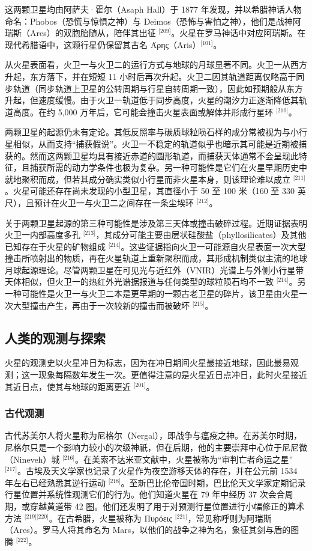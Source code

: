 这两颗卫星均由阿萨夫·霍尔（Asaph Hall）于 1877 年发现，并以希腊神话人物命名：Phobos（恐慌与惊惧之神）与 Deimos（恐怖与害怕之神），他们是战神阿瑞斯（Ares）的双胞胎随从，陪伴其出征 \(^{\text{[209]}}\)。火星在罗马神话中对应阿瑞斯。在现代希腊语中，这颗行星仍保留其古名 Άρης（Aris）\(^{\text{[101]}}\)。

从火星表面看，火卫一与火卫二的运行方式与地球的月球显著不同。火卫一从西方升起，东方落下，并在短短 11 小时后再次升起。火卫二因其轨道距离仅略高于同步轨道（同步轨道上卫星的公转周期与行星自转周期一致），因此如预期般从东方升起，但速度缓慢。由于火卫一轨道低于同步高度，火星的潮汐力正逐渐降低其轨道高度。在约 5,000 万年后，它可能会撞击火星表面或解体并形成行星环 \(^{\text{[210]}}\)。

两颗卫星的起源仍未有定论。其低反照率与碳质球粒陨石样的成分常被视为与小行星相似，从而支持“捕获假说”。火卫一不稳定的轨道似乎也暗示其可能是近期被捕获的。然而这两颗卫星均具有接近赤道的圆形轨道，而捕获天体通常不会呈现此特征，且捕获所需的动力学条件也极为复杂。另一种可能性是它们在火星早期历史中就地聚积而成，但若其成分确实类似小行星而非火星本身，则该理论难以成立 \(^{\text{[211]}}\)。火星可能还存在尚未发现的小型卫星，其直径小于 50 至 100 米（160 至 330 英尺），且预计在火卫一与火卫二之间存在一条尘埃环 \(^{\text{[212]}}\)。

关于两颗卫星起源的第三种可能性是涉及第三天体或撞击破碎过程。近期证据表明火卫一内部高度多孔 \(^{\text{[213]}}\)，其成分可能主要由层状硅酸盐（phyllosilicates）及其他已知存在于火星的矿物组成 \(^{\text{[214]}}\)。这些证据指向火卫一可能源自火星表面一次大型撞击所喷射出的物质，再在火星轨道上重新聚积而成，其形成机制类似主流的地球月球起源理论。尽管两颗卫星在可见光与近红外（VNIR）光谱上与外侧小行星带天体相似，但火卫一的热红外光谱据报道与任何类型的球粒陨石均不一致 \(^{\text{[214]}}\)。另一种可能性是火卫一与火卫二本是更早期的一颗古老卫星的碎片，该卫星由火星一次大型撞击产生，再由于一次较新的撞击而被破坏 \(^{\text{[215]}}\)。
\subsection{人类的观测与探索}
火星的观测史以火星冲日为标志，因为在冲日期间火星最接近地球，因此最易观测；这一现象每隔数年发生一次。更值得注意的是火星近日点冲日，此时火星接近其近日点，使其与地球的距离更近 \(^{\text{[201]}}\)。
\subsubsection{古代观测}  
古代苏美尔人将火星称为尼格尔（Nergal），即战争与瘟疫之神。在苏美尔时期，尼格尔只是一个影响力较小的次级神祇，但在后期，他的主要崇拜中心位于尼尼微（Nineveh）城 \(^{\text{[216]}}\)。在美索不达米亚文献中，火星被称为“审判亡者命运之星” \(^{\text{[217]}}\)。古埃及天文学家也记录了火星作为夜空游移天体的存在，并在公元前 1534 年左右已经熟悉其逆行运动 \(^{\text{[218]}}\)。至新巴比伦帝国时期，巴比伦天文学家定期记录行星位置并系统性观测它们的行为。他们知道火星在 79 年中经历 37 次会合周期，或穿越黄道带 42 圈。他们还发明了用于对预测行星位置进行小幅修正的算术方法 \(^{\text{[219][220]}}\)。在古希腊，火星被称为 Πυρόεις \(^{\text{[221]}}\)，常见称呼则为阿瑞斯（Ares）。罗马人将其命名为 Mars，以他们的战争之神为名，象征其剑与盾的图腾 \(^{\text{[222]}}\)。


